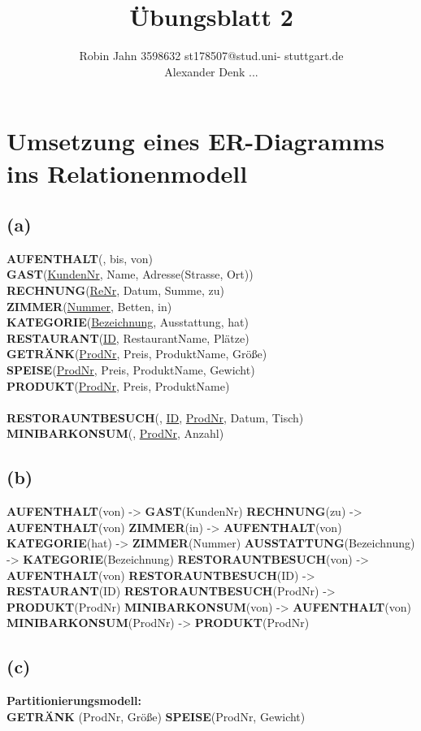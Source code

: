 \documentclass{article}
\title{Übungsblatt 2}
\author{Robin Jahn 3598632 st178507@stud.uni-
stuttgart.de \\
Alexander Denk ... }
\begin{document}
\section{Umsetzung eines ER-Diagramms ins Relationenmodell}

\subsection{(a)}
\textbf{AUFENTHALT}(, bis, von) \\
\textbf{GAST}(\underline{KundenNr}, Name, Adresse(Strasse, Ort)) \\ 
\textbf{RECHNUNG}(\underline{ReNr}, Datum, Summe, zu)\\
\textbf{ZIMMER}(\underline{Nummer}, Betten, in)\\
\textbf{KATEGORIE}(\underline{Bezeichnung}, {Ausstattung}, hat)\\
\textbf{RESTAURANT}(\underline{ID}, RestaurantName, Plätze)\\
\textbf{GETRÄNK}(\underline{ProdNr}, Preis, ProduktName, Größe)\\
\textbf{SPEISE}(\underline{ProdNr}, Preis, ProduktName, Gewicht)\\
\textbf{PRODUKT}(\underline{ProdNr}, Preis, ProduktName)\\ \\
\textbf{RESTORAUNTBESUCH}(, \underline{ID}, \underline{ProdNr}, Datum, Tisch)\\
\textbf{MINIBARKONSUM}(, \underline{ProdNr}, Anzahl)\\    
    

\subsection{(b)}
\textbf{AUFENTHALT}(von) -> \textbf{GAST}(KundenNr)
\textbf{RECHNUNG}(zu) -> \textbf{AUFENTHALT}(von)
\textbf{ZIMMER}(in) -> \textbf{AUFENTHALT}(von)
\textbf{KATEGORIE}(hat) -> \textbf{ZIMMER}(Nummer)
\textbf{AUSSTATTUNG}(Bezeichnung) -> \textbf{KATEGORIE}(Bezeichnung)
\textbf{RESTORAUNTBESUCH}(von) -> \textbf{AUFENTHALT}(von)
\textbf{RESTORAUNTBESUCH}(ID) -> \textbf{RESTAURANT}(ID)
\textbf{RESTORAUNTBESUCH}(ProdNr) -> \textbf{PRODUKT}(ProdNr)
\textbf{MINIBARKONSUM}(von) -> \textbf{AUFENTHALT}(von)
\textbf{MINIBARKONSUM}(ProdNr) -> \textbf{PRODUKT}(ProdNr)

\subsection{(c)}
\textbf{Partitionierungsmodell:} \\
\textbf{GETRÄNK} (ProdNr, Größe)
\textbf{SPEISE}(ProdNr, Gewicht)\\ \\
\end{document}
